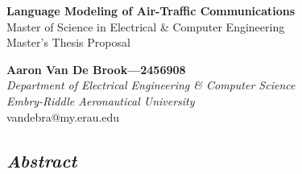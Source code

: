 \documentclass[10pt]{article}
\begin{document}
    \begin{center}
        \LARGE
        \textbf{Language Modeling of Air-Traffic Communications}\\
        \Large
        Master of Science in Electrical \& Computer Engineering\\
        Master's Thesis Proposal\\

        \vspace*{0.25in}

        \normalsize
        \textbf{Aaron Van De Brook---2456908}\\
        \textit{Department of Electrical Engineering \& Computer Science}\\
        \textit{Embry-Riddle Aeronautical University}\\
        vandebra@my.erau.edu
    \end{center}

    \begin{center}
        \section*{\textit{Abstract}}
        \noindent
        \justifying
        \textit{
            \lipsum[1]
        }
    \end{center}

\end{document}
